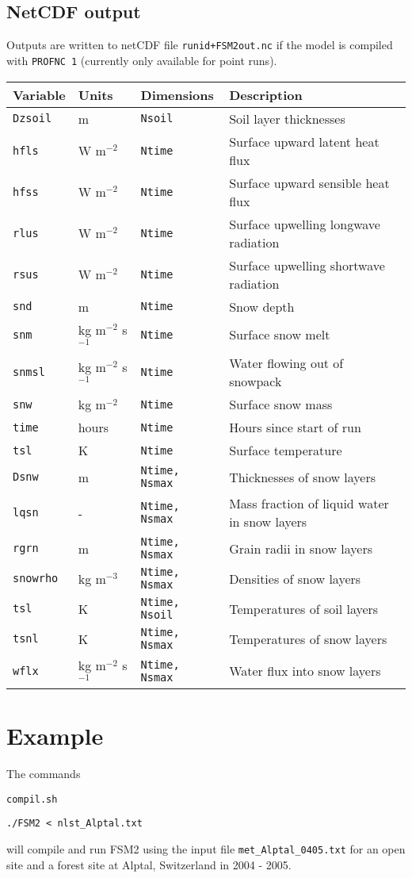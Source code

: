 \documentclass{article}
\begin{document}
\subsection{NetCDF output}

Outputs are written to netCDF file {\tt runid+FSM2out.nc} if the model is compiled with {\tt PROFNC 1} (currently only available for point runs).

\begin{longtable}{|l|l|l|l|} \hline
Variable      & Units       & Dimensions          & Description                           \\ \hline
{\tt Dzsoil}  & m           & {\tt Nsoil}         & Soil layer thicknesses                \\
{\tt hfls}    & W m$^{-2}$  & {\tt Ntime}         & Surface upward latent heat flux       \\
{\tt hfss}    & W m$^{-2}$  & {\tt Ntime}         & Surface upward sensible heat flux     \\
{\tt rlus}    & W m$^{-2}$  & {\tt Ntime}         & Surface upwelling longwave radiation  \\
{\tt rsus}    & W m$^{-2}$  & {\tt Ntime}         & Surface upwelling shortwave radiation \\
{\tt snd}     & m           & {\tt Ntime}         & Snow depth                            \\
{\tt snm}     & kg m$^{-2}$ s$^{-1}$& {\tt Ntime} & Surface snow melt                     \\
{\tt snmsl}   & kg m$^{-2}$ s$^{-1}$& {\tt Ntime} & Water flowing out of snowpack         \\
{\tt snw}     & kg m$^{-2}$ & {\tt Ntime}         & Surface snow mass                     \\
{\tt time}    & hours       & {\tt Ntime}         & Hours since start of run              \\
{\tt tsl}     & K           & {\tt Ntime}         & Surface temperature                   \\
{\tt Dsnw}    & m           & {\tt Ntime, Nsmax}  & Thicknesses of snow layers            \\
{\tt lqsn}    & -           & {\tt Ntime, Nsmax}  & Mass fraction of liquid water in snow layers  \\
{\tt rgrn}    & m           & {\tt Ntime, Nsmax}  & Grain radii in snow layers            \\
{\tt snowrho} & kg m$^{-3}$ & {\tt Ntime, Nsmax}  & Densities of snow layers              \\
{\tt tsl}     & K           & {\tt Ntime, Nsoil}  & Temperatures of soil layers           \\
{\tt tsnl}    & K           & {\tt Ntime, Nsmax}  & Temperatures of snow layers           \\
{\tt wflx}    & kg m$^{-2}$ s$^{-1}$  & {\tt Ntime, Nsmax}  & Water flux into snow layers \\
\hline 
\end{longtable}

\section{Example}
The commands

{\tt compil.sh}

{\tt ./FSM2 < nlst\_Alptal.txt}

will compile and run FSM2 using the input file {\tt met\_Alptal\_0405.txt} for an open site and a forest site at Alptal, Switzerland in 2004 - 2005.
\end{document}
